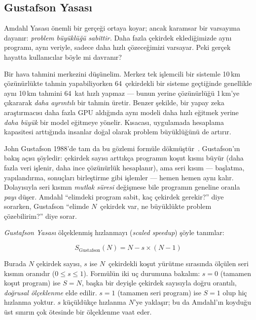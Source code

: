 \subsection{Gustafson Yasası}
\label{subsec:gustafson}

Amdahl Yasası önemli bir gerçeği ortaya koyar; ancak karamsar bir varsayıma dayanır: \emph{problem büyüklüğü sabittir.} Daha fazla çekirdek eklediğimizde aynı programı, aynı veriyle, sadece daha hızlı çözeceğimizi varsayar. Peki gerçek hayatta kullanıcılar böyle mi davranır?

Bir hava tahmini merkezini düşünelim. Merkez tek işlemcili bir sistemle 10\,km çözünürlükte tahmin yapabiliyorken 64~çekirdekli bir sisteme geçtiğinde genellikle aynı 10\,km tahmini 64~kat hızlı yapmaz --- bunun yerine çözünürlüğü 1\,km'ye çıkararak \emph{daha ayrıntılı} bir tahmin üretir. Benzer şekilde, bir yapay zeka araştırmacısı daha fazla GPU aldığında aynı modeli daha hızlı eğitmek yerine \emph{daha büyük} bir model eğitmeye yönelir. Kısacası, uygulamada hesaplama kapasitesi arttığında insanlar doğal olarak problem büyüklüğünü de artırır.

John Gustafson 1988'de tam da bu gözlemi formüle dökmüştür~\cite{gustafson1988}. Gustafson'ın bakış açısı şöyledir: çekirdek sayısı arttıkça programın koşut kısmı büyür (daha fazla veri işlenir, daha ince çözünürlük hesaplanır), ama seri kısım --- başlatma, yapılandırma, sonuçları birleştirme gibi işlemler --- hemen hemen aynı kalır. Dolayısıyla seri kısmın \emph{mutlak süresi} değişmese bile programın geneline oranla \emph{payı} düşer. Amdahl ``elimdeki program sabit, kaç çekirdek gerekir?'' diye sorarken, Gustafson ``elimde $N$~çekirdek var, ne büyüklükte problem çözebilirim?'' diye sorar.

\emph{Gustafson Yasası} ölçeklenmiş hızlanmayı (\emph{scaled speedup}) şöyle tanımlar:

\begin{equation}
S_{\text{Gustafson}}(N) = N - s \times (N - 1)
\label{eq:gustafson}
\end{equation}

\noindent Burada $N$ çekirdek sayısı, $s$ ise $N$~çekirdekli koşut yürütme sırasında ölçülen seri kısmın oranıdır ($0 \le s \le 1$). Formülün iki uç durumuna bakalım: $s = 0$ (tamamen koşut program) ise $S = N$, başka bir deyişle çekirdek sayısıyla doğru orantılı, \emph{doğrusal ölçeklenme} elde edilir. $s = 1$ (tamamen seri program) ise $S = 1$ olup hiç hızlanma yoktur. $s$ küçüldükçe hızlanma $N$'ye yaklaşır; bu da Amdahl'ın koyduğu üst sınırın çok ötesinde bir ölçeklenme vaat eder.

